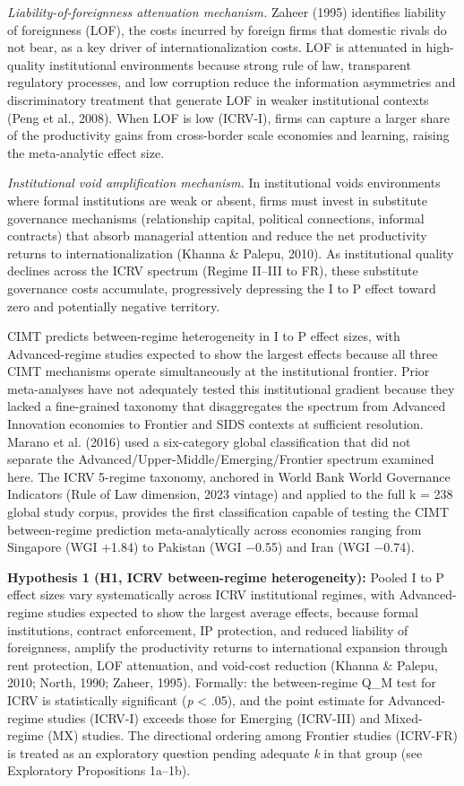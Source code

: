 \documentclass[
  12pt,a4paper]{article}
\begin{document}
\emph{Liability-of-foreignness attenuation mechanism.} Zaheer (1995)
identifies liability of foreignness (LOF), the costs incurred by foreign
firms that domestic rivals do not bear, as a key driver of
internationalization costs. LOF is attenuated in high-quality
institutional environments because strong rule of law, transparent
regulatory processes, and low corruption reduce the information
asymmetries and discriminatory treatment that generate LOF in weaker
institutional contexts (Peng et al., 2008). When LOF is low (ICRV-I),
firms can capture a larger share of the productivity gains from
cross-border scale economies and learning, raising the meta-analytic
effect size.

\emph{Institutional void amplification mechanism.} In institutional
voids environments where formal institutions are weak or absent, firms
must invest in substitute governance mechanisms (relationship capital,
political connections, informal contracts) that absorb managerial
attention and reduce the net productivity returns to
internationalization (Khanna \& Palepu, 2010). As institutional quality
declines across the ICRV spectrum (Regime II--III to FR), these
substitute governance costs accumulate, progressively depressing the I
to P effect toward zero and potentially negative territory.

CIMT predicts between-regime heterogeneity in I to P effect sizes, with
Advanced-regime studies expected to show the largest effects because all
three CIMT mechanisms operate simultaneously at the institutional
frontier. Prior meta-analyses have not adequately tested this
institutional gradient because they lacked a fine-grained taxonomy that
disaggregates the spectrum from Advanced Innovation economies to
Frontier and SIDS contexts at sufficient resolution. Marano et al.
(2016) used a six-category global classification that did not separate
the Advanced/Upper-Middle/Emerging/Frontier spectrum examined here. The
ICRV 5-regime taxonomy, anchored in World Bank World Governance
Indicators (Rule of Law dimension, 2023 vintage) and applied to the full
k = 238 global study corpus, provides the first classification capable
of testing the CIMT between-regime prediction meta-analytically across
economies ranging from Singapore (WGI +1.84) to Pakistan (WGI −0.55) and
Iran (WGI −0.74).

\textbf{Hypothesis 1 (H1, ICRV between-regime heterogeneity):} Pooled I
to P effect sizes vary systematically across ICRV institutional regimes,
with Advanced-regime studies expected to show the largest average
effects, because formal institutions, contract enforcement, IP
protection, and reduced liability of foreignness, amplify the
productivity returns to international expansion through rent protection,
LOF attenuation, and void-cost reduction (Khanna \& Palepu, 2010; North,
1990; Zaheer, 1995). Formally: the between-regime Q\_M test for ICRV is
statistically significant (\emph{p} \textless{} .05), and the point
estimate for Advanced-regime studies (ICRV-I) exceeds those for Emerging
(ICRV-III) and Mixed-regime (MX) studies. The directional ordering among
Frontier studies (ICRV-FR) is treated as an exploratory question pending
adequate \emph{k} in that group (see Exploratory Propositions 1a--1b).
\end{document}
